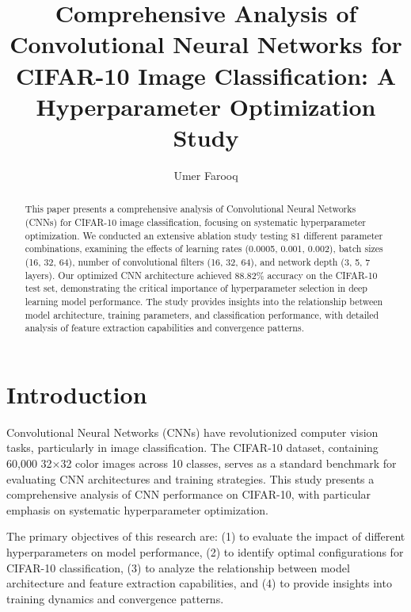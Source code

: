 \documentclass[norunningheads]{llncs}
\begin{document}
\title{Comprehensive Analysis of Convolutional Neural Networks for CIFAR-10 Image Classification: A Hyperparameter Optimization Study}

\author{Umer Farooq}


\maketitle

\begin{abstract}
This paper presents a comprehensive analysis of Convolutional Neural Networks (CNNs) for CIFAR-10 image classification, focusing on systematic hyperparameter optimization. We conducted an extensive ablation study testing 81 different parameter combinations, examining the effects of learning rates (0.0005, 0.001, 0.002), batch sizes (16, 32, 64), number of convolutional filters (16, 32, 64), and network depth (3, 5, 7 layers). Our optimized CNN architecture achieved 88.82\% accuracy on the CIFAR-10 test set, demonstrating the critical importance of hyperparameter selection in deep learning model performance. The study provides insights into the relationship between model architecture, training parameters, and classification performance, with detailed analysis of feature extraction capabilities and convergence patterns.

\end{abstract}

\section{Introduction}

Convolutional Neural Networks (CNNs) have revolutionized computer vision tasks, particularly in image classification. The CIFAR-10 dataset, containing 60,000 32×32 color images across 10 classes, serves as a standard benchmark for evaluating CNN architectures and training strategies. This study presents a comprehensive analysis of CNN performance on CIFAR-10, with particular emphasis on systematic hyperparameter optimization.

The primary objectives of this research are: (1) to evaluate the impact of different hyperparameters on model performance, (2) to identify optimal configurations for CIFAR-10 classification, (3) to analyze the relationship between model architecture and feature extraction capabilities, and (4) to provide insights into training dynamics and convergence patterns.
\end{document}
